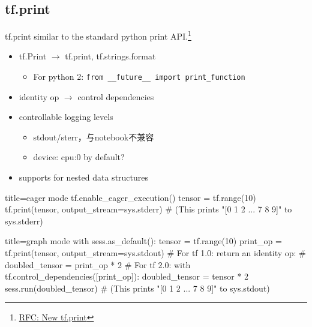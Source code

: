 
\subsection{tf.print}
\begin{frame}{tf.print}
    similar to the standard python print API.\footnote{\href{https://github.com/tensorflow/community/pull/14}{RFC: New tf.print}}

    \begin{itemize}
        \item tf.Print $\to$ tf.print, tf.strings.format
            \begin{itemize}
                \item For python 2: \lstinline{from __future__ import print_function}
            \end{itemize}
        \item identity op $\to$ control dependencies
        \item controllable logging levels
            \begin{itemize}
                \item stdout/sterr，与notebook不兼容
                \item device: cpu:0 by default?
            \end{itemize}
        \item supports for nested data structures
    \end{itemize}
\end{frame}

\begin{frame}[fragile]
    \begin{tcblisting}{title=eager mode}
        tf.enable_eager_execution()
        tensor = tf.range(10)
        tf.print(tensor, output_stream=sys.stderr)
        # (This prints "[0 1 2 ... 7 8 9]" to sys.stderr)
    \end{tcblisting}

    \begin{tcblisting}{title=graph mode}
        with sess.as_default():
          tensor = tf.range(10)
          print_op = tf.print(tensor, output_stream=sys.stdout)
          # For tf 1.0: return an identity op:
          # doubled_tensor = print_op * 2
          # For tf 2.0:
          with tf.control_dependencies([print_op]):
            doubled_tensor = tensor * 2
          sess.run(doubled_tensor)
          # (This prints "[0 1 2 ... 7 8 9]" to sys.stdout)
    \end{tcblisting}
\end{frame}
